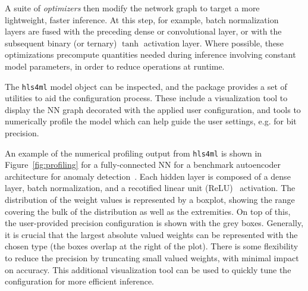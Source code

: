 \documentclass[sigconf]{acmart}
\newcommand{\hlsfml}{\texttt{hls4ml}\xspace}
\begin{document}
A suite of \textit{optimizers} then modify the network graph to target a more lightweight, faster inference. 
At this step, for example, batch normalization~\cite{bn} layers are fused with the preceding dense or convolutional layer, or with the subsequent binary (or ternary) $\tanh$ activation layer.
Where possible, these optimizations precompute quantities needed during inference involving constant model parameters, in order to reduce operations at runtime.

The \hlsfml model object can be inspected, and the package provides a set of utilities to aid the configuration process. 
These include a visualization tool to display the NN graph decorated with the applied user configuration, and tools to numerically profile the model which can help guide the user settings, e.g. for bit precision.

An example of the numerical profiling output from \hlsfml is shown in Figure~\ref{fig:profiling} for a fully-connected NN for a benchmark autoencoder architecture for anomaly detection~\cite{tinyml}. 
Each hidden layer is composed of a dense layer, batch normalization, and a recotified linear unit (ReLU)~\cite{relu1,relu2} activation.
The distribution of the weight values is represented by a boxplot, showing the range covering the bulk of the distribution as well as the extremities. 
On top of this, the user-provided precision configuration is shown with the grey boxes.
Generally, it is crucial that the largest absolute valued weights can be represented with the chosen type (the boxes overlap at the right of the plot).
There is some flexibility to reduce the precision by truncating small valued weights, with minimal impact on accuracy. 
This additional visualization tool can be used to quickly tune the configuration for more efficient inference.
\end{document}
